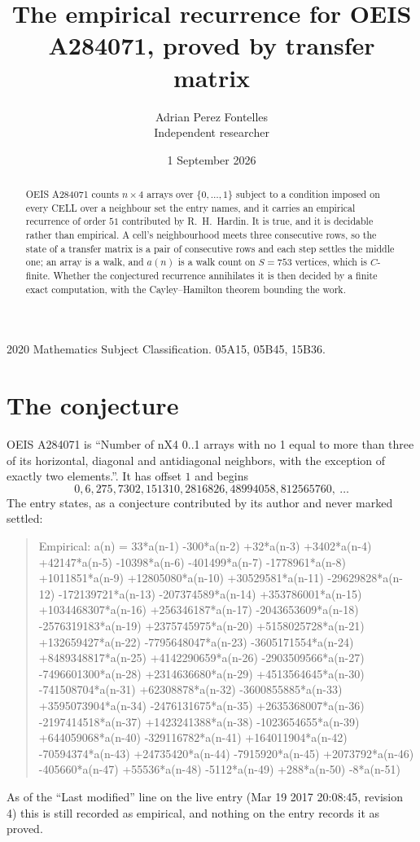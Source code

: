 \documentclass[11pt,a4paper]{article}
\title{The empirical recurrence for OEIS A284071, proved by transfer matrix}
\author{Adrian Perez Fontelles\\ \small Independent researcher}
\date{1 September 2026}
\theoremstyle{plain}
\theoremstyle{definition}
\begin{document}
\maketitle

\begin{abstract}
OEIS A284071 counts $n\times4$ arrays over $\{0,\dots,1\}$ subject to a condition imposed on
every CELL over a neighbour set the entry names, and it carries an empirical recurrence of
order $51$ contributed by R.~H.~Hardin. It is true, and it is decidable rather than
empirical. A cell's neighbourhood meets three consecutive rows, so the state of a transfer
matrix is a pair of consecutive rows and each step settles the middle one; an array is a
walk, and $a(n)$ is a walk count on $S=753$ vertices, which is $C$-finite. Whether the
conjectured recurrence annihilates it is then decided by a finite exact computation, with the
Cayley--Hamilton theorem bounding the work.
\end{abstract}

\noindent\small 2020 Mathematics Subject Classification. 05A15, 05B45, 15B36.\normalsize

\section{The conjecture}

OEIS A284071 is ``Number of nX4 0..1 arrays with no 1 equal to more than three of its horizontal, diagonal and antidiagonal neighbors, with the exception of exactly two elements.''. It has offset $1$ and begins
\[
0, 6, 275, 7302, 151310, 2816826, 48994058, 812565760,\ \dots
\]
The entry states, as a conjecture contributed by its author and never marked settled:
\begin{quote}
Empirical: a(n) = 33*a(n-1) -300*a(n-2) +32*a(n-3) +3402*a(n-4) +42147*a(n-5) -10398*a(n-6) -401499*a(n-7) -1778961*a(n-8) +1011851*a(n-9) +12805080*a(n-10) +30529581*a(n-11) -29629828*a(n-12) -172139721*a(n-13) -207374589*a(n-14) +353786001*a(n-15) +1034468307*a(n-16) +256346187*a(n-17) -2043653609*a(n-18) -2576319183*a(n-19) +2375745975*a(n-20) +5158025728*a(n-21) +132659427*a(n-22) -7795648047*a(n-23) -3605171554*a(n-24) +8489348817*a(n-25) +4142290659*a(n-26) -2903509566*a(n-27) -7496601300*a(n-28) +2314636680*a(n-29) +4513564645*a(n-30) -741508704*a(n-31) +62308878*a(n-32) -3600855885*a(n-33) +3595073904*a(n-34) -2476131675*a(n-35) +2635368007*a(n-36) -2197414518*a(n-37) +1423241388*a(n-38) -1023654655*a(n-39) +644059068*a(n-40) -329116782*a(n-41) +164011904*a(n-42) -70594374*a(n-43) +24735420*a(n-44) -7915920*a(n-45) +2073792*a(n-46) -405660*a(n-47) +55536*a(n-48) -5112*a(n-49) +288*a(n-50) -8*a(n-51)
\end{quote}
As of the ``Last modified'' line on the live entry (Mar 19 2017 20:08:45, revision 4) this is still
recorded as empirical, and nothing on the entry records it as proved.
\end{document}
